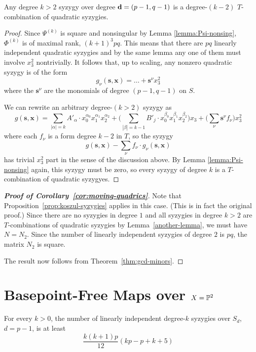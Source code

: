 \documentclass[fleqn,reqno]{amsart}
\begin{document}
\begin{lemma}
\label{another-lemma}
Any degree $k>2$ syzygy over degree $\mathbf d=(p-1,q-1)$ is
a degree-$(k-2)$ $T$-combination of quadratic syzygies.
\end{lemma}

\begin{proof}
Since $\Psi^{(k)}$ is square and nonsingular by Lemma \ref{lemma:Psi-nonsing},
$\Phi^{(k)}$ is of maximal rank, $(k+1)^3pq$.
This means that there are $pq$ linearly independent quadratic syzygies
and by the same lemma any one of them must involve $x_3^2$ nontrivially.
It follows that, up to scaling, any nonzero quadratic syzygy is of the form
\[
	g_\nu(\mathbf s,\mathbf x)=\ldots+{\mathbf{s}}^\nu x_3^2
\]
where the $\mathbf{s}^\nu$ are the monomials of degree $(p-1,q-1)$ on $S$.

We can rewrite an arbitrary degree-$(k>2)$ syzygy as
\[
	g(\mathbf s, \mathbf x)=\sum_{|\alpha|=k} A'_\alpha\cdot
	x_0^{\alpha_0}x_1^{\alpha_1}x_2^{\alpha_2}+
	\big(\sum_{|\beta|=k-1} B'_{j}\cdot
	x_0^{\beta_0}x_1^{\beta_1}x_2^{\beta_2}\big)x_3+
	\big(\sum_\nu \mathbf{s}^\nu f_\nu\big)x_3^2
\]
where each $f_\nu$ is a form degree $k-2$ in $T$, so the syzygy
\[
	g(\mathbf s, \mathbf x)-\sum_\nu f_\nu\cdot g_\nu(\mathbf s, \mathbf x)
\]
has trivial $x_3^2$ part in the sense of the discussion above.
By Lemma \ref{lemma:Psi-nonsing} again, this syzygy must be zero,
so every syzygy of degree $k$ is a $T$-combination of quadratic syzygyes.
\end{proof}

\begin{proof}[\bf Proof of Corollary~\ref{cor:moving-quadrics}]
Note that Proposition~\ref{prop:koszul-syzygies} applies in this case.
(This is in fact the original proof.)
Since there are no syzygies in degree $1$ and all syzygies in degree $k>2$ are
$T$-combinations of quadratic syzygies by Lemma~\ref{another-lemma},
we must have $N=N_2$.
Since the number of linearly independent syzygies of degree $2$ is $pq$,
the matrix $N_2$ is square.

The result now follows from Theorem~\ref{thm:gcd-minors}.
\end{proof}



\section{Basepoint-Free Maps over $X=\mathbb{P}^2$}
\label{sec:moving-planes-quadrics}

\begin{lemma}
	\label{lemma:rel-moving-planes-quadrics-min-dims}
	For every $k>0$, the number of linearly independent degree-$k$ syzygies over $S_{d}$,
	$d=p-1$, is at least
	\[
		\frac{k(k+1)p}{12}(kp-p+k+5)
	\]
\end{lemma}
\end{document}
